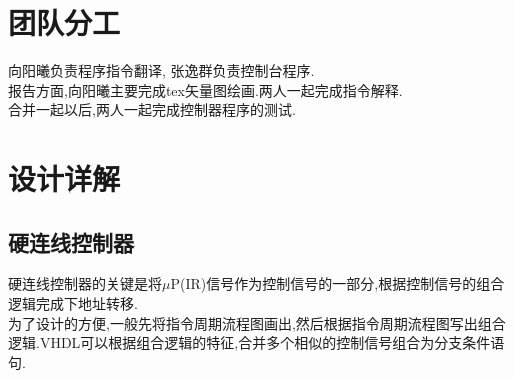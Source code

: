 \documentclass[UTF8]{ctexart}
\begin{document}
\section{团队分工}
向阳曦负责程序指令翻译, 张逸群负责控制台程序.\\
报告方面,向阳曦主要完成tex矢量图绘画.两人一起完成指令解释.\\
\indent 合并一起以后,两人一起完成控制器程序的测试.
\section{设计详解}
\subsection{硬连线控制器}
硬连线控制器的关键是将$\mu \text{P}$(IR)信号作为控制信号的一部分,根据控制信号的组合逻辑完成下地址转移.\\
\indent 为了设计的方便,一般先将指令周期流程图画出,然后根据指令周期流程图写出组合逻辑.VHDL可以根据组合逻辑的特征,合并多个相似的控制信号组合为分支条件语句.
\end{document}
